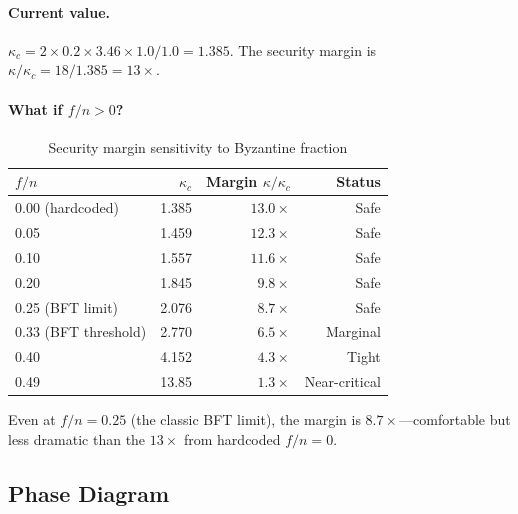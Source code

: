 \documentclass[11pt,a4paper]{article}
\begin{document}
\paragraph{Current value.} $\kappa_c = 2 \times 0.2 \times 3.46 \times 1.0 / 1.0 = 1.385$. The security margin is $\kappa/\kappa_c = 18/1.385 = 13\times$.

\paragraph{What if $f/n > 0$?}

\begin{table}[H]
\centering
\caption{Security margin sensitivity to Byzantine fraction}
\label{tab:margin}
\begin{tabular}{@{}lrrr@{}}
\toprule
$f/n$ & $\kappa_c$ & Margin $\kappa/\kappa_c$ & \textbf{Status} \\
\midrule
0.00 (\textcolor{hardcoded}{hardcoded}) & 1.385 & $13.0\times$ & Safe \\
0.05 & 1.459 & $12.3\times$ & Safe \\
0.10 & 1.557 & $11.6\times$ & Safe \\
0.20 & 1.845 & $9.8\times$ & Safe \\
0.25 (BFT limit) & 2.076 & $8.7\times$ & Safe \\
0.33 (BFT threshold) & 2.770 & $6.5\times$ & Marginal \\
0.40 & 4.152 & $4.3\times$ & Tight \\
0.49 & 13.85 & $1.3\times$ & Near-critical \\
\bottomrule
\end{tabular}
\end{table}

Even at $f/n = 0.25$ (the classic BFT limit), the margin is $8.7\times$---comfortable but less dramatic than the $13\times$ from hardcoded $f/n = 0$.

\subsection{Phase Diagram}
\end{document}
